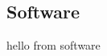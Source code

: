 \documentclass[.../Dokumentation.tex]{subfiles}
\begin{document}
    \subsection{Software}\label{sec-components-software}
    hello from software
\end{document}
